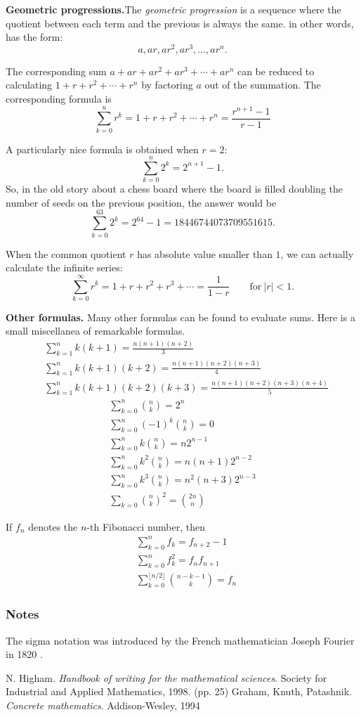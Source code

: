 \documentclass[12pt]{article}
\begin{document}
\medskip\textbf{Geometric progressions.}The \emph{geometric progression} is a sequence where the quotient between each term and the previous is always the same. in other words, has the form:
\[
a,ar,ar^2,ar^3,\ldots,ar^n.
\]

The corresponding sum $a+ar+ar^2 + ar^3 + \cdots + ar^n$ can be reduced to calculating $1+r+r^2 + \cdots +r^n$ by factoring $a$ out of the summation. The corresponding formula is
\[
\sum_{k=0}^n r^k = 1+r +r^2 +\cdots + r^n = \frac{r^{n+1}-1}{r-1}
\]

A particularly nice formula is obtained when $r=2$:
\[
\sum_{k=0}^n 2^k = 2^{n+1} -1.
\]
So, in the old story about a chess board where the board is filled doubling the number of seeds on the previous position, the answer would be
\[
\sum_{k=0}^{63} 2^k = 2^{64}-1 = 18446744073709551615.
\]

When the common quotient $r$ has absolute value smaller than $1$, we can actually calculate the infinite series:
\[
\sum_{k=0}^\infty r^k = 1+ r + r^2 + r^3 + \cdots =\frac{1}{1-r}\qquad \mathrm{for\ }|r|<1.
\]

\medskip\textbf{Other formulas.}
Many other formulas can be found to evaluate sums. Here is a small miscellanea of remarkable formulas.
\begin{align*}
&\sum_{k=1}^n k(k+1) =\frac{n(n+1)(n+2)}{3}\\
&\sum_{k=1}^n k(k+1)(k+2) =\frac{n(n+1)(n+2)(n+3)}{4}\\
&\sum_{k=1}^n k(k+1)(k+2)(k+3) =\frac{n(n+1)(n+2)(n+3)(n+4)}{5}
\end{align*} 
\begin{align*}
&\sum_{k=0}^n {n\choose k}=2^n\\
&\sum_{k=0}^n (-1)^k{n\choose k}=0\\
&\sum_{k=0}^n k{n\choose k} = n2^{n-1}\\
&\sum_{k=0}^n k^2{n\choose k} = n(n+1)2^{n-2}\\
&\sum_{k=0}^n k^3{n\choose k} = n^2(n+3)2^{n-3}\\
&\sum_{k=0}{n\choose k}^2 ={2n\choose n}
&\end{align*}

If $f_n$ denotes the $n$-th Fibonacci number, then
\begin{align*}
&\sum_{k=0}^n f_k = f_{n+2}-1\\
&\sum_{k=0}^n f_k^2 = f_nf_{n+1}\\
&\sum_{k=0}^{\lfloor n/2\rfloor} {n-k-1\choose k}=f_n
\end{align*}

\subsubsection*{Notes}
The sigma notation was introduced by the French mathematician 
Joseph Fourier in 1820 \cite{Higham}.

\begin{thebibliography}{9}
 N. Higham. \emph{Handbook of writing for the mathematical sciences}. Society for Industrial and Applied Mathematics, 1998.
(pp. 25)
 Graham, Knuth, Patashnik. \emph{Concrete mathematics}. Addison-Wesley, 1994
\end{thebibliography}
\end{document}
